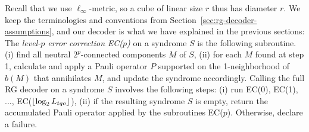 Recall that we use $\ell_\infty$-metric, so a cube of linear size $r$ thus has diameter $r$.
We keep the terminologies and conventions from Section~\ref{sec:rg-decoder-assumptions},
and our decoder is what we have explained in the previous sections:
%
The \emph{level-$p$ error correction} {\em EC($p$)} on a syndrome $S$ is the following subroutine.
(i) find all neutral $2^p$-connected components $M$ of $S$,
(ii) for each $M$ found at step 1, calculate and apply a Pauli operator $P$ supported on the 1-neighborhood of $b(M)$ that annihilates $M$, and update the syndrome accordingly.
Calling the full RG decoder on a syndrome $S$ involves the following steps:
(i) run EC(0), EC(1), ..., EC($\lfloor \log_2 {L_{tqo}} \rfloor$),
(ii) if the resulting syndrome $S$ is empty, return the accumulated Pauli operator applied by the subroutines EC($p$). Otherwise, declare a failure.

